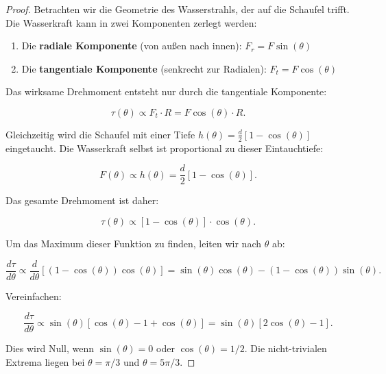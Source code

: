\documentclass[a4paper,12pt]{article}
\theoremstyle{definition}
\begin{document}
\begin{proof}
  Betrachten wir die Geometrie des Wasserstrahls, der auf die Schaufel trifft. Die Wasserkraft kann in zwei Komponenten zerlegt werden:
  
  \begin{enumerate}
    \item Die \textbf{radiale Komponente} (von außen nach innen): $F_r = F \sin(\theta)$
    \item Die \textbf{tangentiale Komponente} (senkrecht zur Radialen): $F_t = F \cos(\theta)$
  \end{enumerate}
  
  Das wirksame Drehmoment entsteht nur durch die tangentiale Komponente:
  
  \begin{equation}
    \tau(\theta) \propto F_t \cdot R = F \cos(\theta) \cdot R.
  \end{equation}
  
  Gleichzeitig wird die Schaufel mit einer Tiefe $h(\theta) = \frac{d}{2}[1-\cos(\theta)]$ eingetaucht. Die Wasserkraft selbst ist proportional zu dieser Eintauchtiefe:
  
  \begin{equation}
    F(\theta) \propto h(\theta) = \frac{d}{2}[1-\cos(\theta)].
  \end{equation}
  
  Das gesamte Drehmoment ist daher:
  
  \begin{equation}
    \tau(\theta) \propto [1-\cos(\theta)] \cdot \cos(\theta).
    \label{eq:tau_symmetrie}
  \end{equation}
  
  Um das Maximum dieser Funktion zu finden, leiten wir nach $\theta$ ab:
  
  \begin{equation}
    \frac{d\tau}{d\theta} \propto \frac{d}{d\theta}[(1-\cos(\theta))\cos(\theta)] = \sin(\theta)\cos(\theta) - (1-\cos(\theta))\sin(\theta).
  \end{equation}
  
  Vereinfachen:
  
  \begin{equation}
    \frac{d\tau}{d\theta} \propto \sin(\theta)[\cos(\theta) - 1 + \cos(\theta)] = \sin(\theta)[2\cos(\theta) - 1].
  \end{equation}
  
  Dies wird Null, wenn $\sin(\theta) = 0$ oder $\cos(\theta) = 1/2$. Die nicht-trivialen Extrema liegen bei $\theta = \pi/3$ und $\theta = 5\pi/3$.
  

\end{proof}
\end{document}
